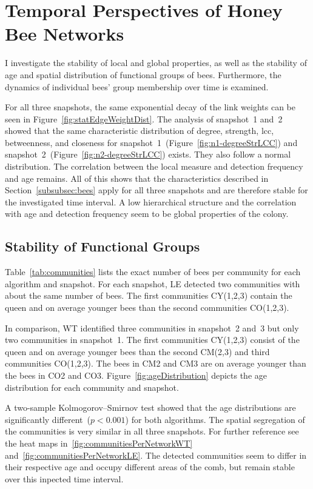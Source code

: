 \section{Temporal Perspectives of Honey Bee Networks}
I investigate the stability of local and global properties, as well as the stability of age and spatial distribution of functional groups of bees.
Furthermore, the dynamics of individual bees' group membership over time is examined.

For all three snapshots, the same exponential decay of the link weights can be seen in Figure~\ref{fig:statEdgeWeightDist}.
The analysis of snapshot~1 and~2 showed that the same characteristic distribution of degree, strength, lcc, betweenness, and closeness for snapshot~1~(Figure~\ref{fig:n1-degreeStrLCC}) and snapshot~2~(Figure~\ref{fig:n2-degreeStrLCC}) exists. They also follow a normal distribution. The correlation between the local measure and detection frequency and age remains.
All of this shows that the characteristics described in Section~\ref{subsubsec:bees} apply for all three snapshots and are therefore stable for the investigated time interval. A low hierarchical structure and the correlation with age and detection frequency seem to be global properties of the colony.

\subsection{Stability of Functional Groups}
Table~\ref{tab:communities} lists the exact number of bees per community for each algorithm and snapshot.
For each snapshot, LE detected two communities with about the same number of bees.
The first communities CY(1,2,3) contain the queen and on average younger bees than the second communities CO(1,2,3).

In comparison, WT identified three communities in snapshot~2 and~3 but only two communities in snapshot~1.
The first communities CY(1,2,3) consist of the queen and on average younger bees than the second CM(2,3) and third communities CO(1,2,3).
The bees in CM2 and CM3 are on average younger than the bees in CO2 and CO3.
Figure~\ref{fig:ageDistribution} depicts the age distribution for each community and snapshot.

A two-sample Kolmogorov–Smirnov test showed that the age distributions are significantly different~($p< 0.001$) for both algorithms.
The spatial segregation of the communities is very similar in all three snapshots. For further reference see the heat maps in~\ref{fig:communitiesPerNetworkWT} and~\ref{fig:communitiesPerNetworkLE}.
The detected communities seem to differ in their respective age and occupy different areas of the comb, but remain stable over this inpected time interval.

